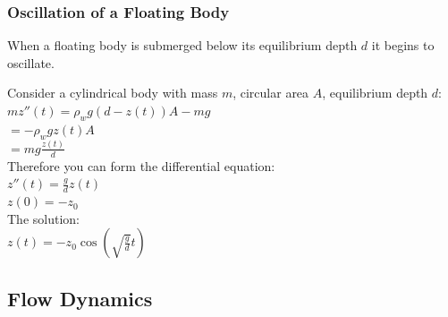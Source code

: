 \subsubsection{Oscillation of a Floating Body}
When a floating body is submerged below its equilibrium depth $d$ it begins to oscillate.
\begin{center}
	Consider a cylindrical body with mass $m$, circular area $A$, equilibrium depth $d$:
	\newline
	\\
	$mz''(t) = \rho_w g (d-z(t))A- mg$
	\\
	$= - \rho_w g z(t)A$
	\\
	$= mg \frac{z(t)}{d}$
	\\
	Therefore you can form the differential equation:
	\\
	$z''(t)= \frac{g}{d}z(t)$
	\\
	$z(0) = -z_0$
	\\
	The solution:
	\\
	$z(t) = -z_0 \cos (\sqrt{\frac{g}{d}} t)$
\end{center}
\subsection{Flow Dynamics}
